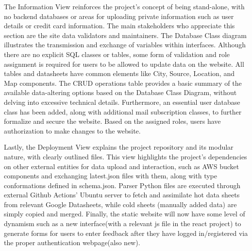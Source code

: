 The Information View reinforces the project's concept of being stand-alone, with no backend databases or areas for uploading private information such as user details or credit card information. The main stakeholders who appreciate this section are the site data validators and maintainers. The Database Class diagram illustrates the transmission and exchange of variables within interfaces. Although there are no explicit SQL classes or tables, some form of validation and role assignment is required for users to be allowed to update data on the website. All tables and datasheets have common elements like City, Source, Location, and Map components. The CRUD operations table provides a basic summary of the available data-altering options based on the Database Class Diagram, without delving into excessive technical details. Furthermore, an essential user database class has been added, along with additional mail subscription classes, to further formalize and secure the website. Based on the assigned roles, users have authorization to make changes to the website.

Lastly, the Deployment View explains the project repository and its modular nature, with clearly outlined files. This view highlights the project's dependencies on other external entities for data upload and interaction, such as AWS bucket components and exchanging latest.json files with them, along with type conformations defined in schema.json. Parser Python files are executed through external Github Actions' Ubuntu server to fetch and assimilate hot data sheets from relevant Google Datasheets, while cold sheets (manually added data) are simply copied and merged. Finally, the static website will now have some level of dynamism such as a new interface(with a relevant js file in the react project) to generate forms for users to enter feedback after they have logged in/registered via the proper authentication webpage(also new).
